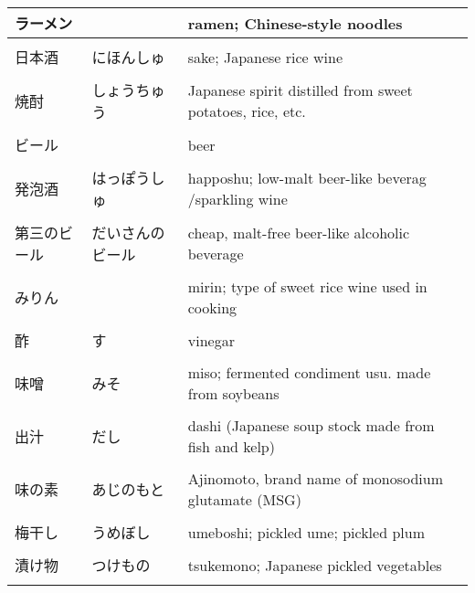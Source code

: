\documentclass{article}
\begin{document}
\begin{tabular}{ l | l | p{11.5cm} }
ラーメン   	&         	&ramen; Chinese-style noodles \\ \hline \\[-1em]
日本酒   	&にほんしゅ    	&sake; Japanese rice wine \\ \hline \\[-1em]									%
焼酎   	&しょうちゅう   	&Japanese spirit distilled from sweet potatoes, rice, etc.   \\ \hline \\[-1em]	%
ビール   	&        	&beer \\ \hline \\[-1em]
発泡酒  	&はっぽうしゅ          	&happoshu; low-malt beer-like beverag /sparkling wine \\ \hline \\[-1em]
第三のビール	&だいさんのビール   	&cheap, malt-free beer-like alcoholic beverage \\ \hline \\[-1em]
みりん       	&              	&mirin; type of sweet rice wine used in cooking \\ \hline \\[-1em]
酢          	&す           	&vinegar \\ \hline \\[-1em]												%
味噌       	&みそ            	&miso; fermented condiment usu. made from soybeans  \\ \hline \\[-1em]
出汁        	&だし            	&dashi (Japanese soup stock made from fish and kelp) \\ \hline \\[-1em]
味の素       	&あじのもと       	&Ajinomoto, brand name of monosodium glutamate (MSG) \\ \hline \\[-1em]
梅干し       	&うめぼし         	&umeboshi; pickled ume; pickled plum  \\ \hline \\[-1em]				%
漬け物       	&つけもの      	&tsukemono; Japanese pickled vegetables  \\ \hline \\[-1em]
\end{tabular}
\end{document}
